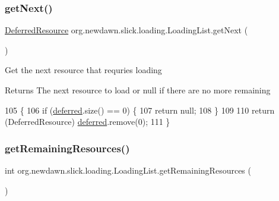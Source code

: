 \subsubsection{\texorpdfstring{get\+Next()}{getNext()}}
{\footnotesize\ttfamily \mbox{\hyperlink{interfaceorg_1_1newdawn_1_1slick_1_1loading_1_1_deferred_resource}{Deferred\+Resource}} org.\+newdawn.\+slick.\+loading.\+Loading\+List.\+get\+Next (\begin{DoxyParamCaption}{ }\end{DoxyParamCaption})\hspace{0.3cm}{\ttfamily [inline]}}

Get the next resource that requries loading

\begin{DoxyReturn}{Returns}
The next resource to load or null if there are no more remaining 
\end{DoxyReturn}

\begin{DoxyCode}
105                                       \{
106         \textcolor{keywordflow}{if} (\mbox{\hyperlink{classorg_1_1newdawn_1_1slick_1_1loading_1_1_loading_list_a5ec264187931448fbcf900ccf59bab72}{deferred}}.size() == 0) \{
107             \textcolor{keywordflow}{return} null;
108         \}
109         
110         \textcolor{keywordflow}{return} (DeferredResource) \mbox{\hyperlink{classorg_1_1newdawn_1_1slick_1_1loading_1_1_loading_list_a5ec264187931448fbcf900ccf59bab72}{deferred}}.remove(0);
111     \}
\end{DoxyCode}
\mbox{\label{classorg_1_1newdawn_1_1slick_1_1loading_1_1_loading_list_a15644b340a431d1a2b6cdd52bd1ecf6d}} 
\subsubsection{\texorpdfstring{get\+Remaining\+Resources()}{getRemainingResources()}}
{\footnotesize\ttfamily int org.\+newdawn.\+slick.\+loading.\+Loading\+List.\+get\+Remaining\+Resources (\begin{DoxyParamCaption}{ }\end{DoxyParamCaption})\hspace{0.3cm}{\ttfamily [inline]}}

